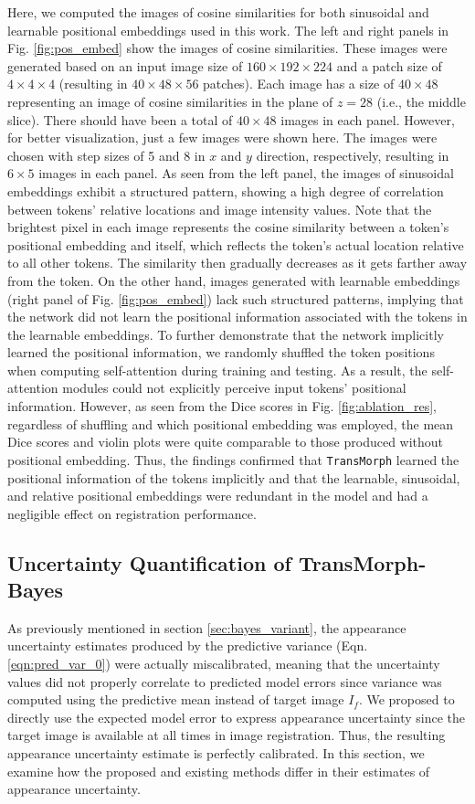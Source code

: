 \documentclass[times,twocolumn,final]{elsarticle}
\begin{document}
Here, we computed the images of cosine similarities for both sinusoidal and learnable positional embeddings used in this work. The left and right panels in Fig. \ref{fig:pos_embed} show the images of cosine similarities. These images were generated based on an input image size of $160\times192\times224$ and a patch size of $4\times4\times4$ (resulting in $40\times48\times56$ patches). Each image has a size of $40\times48$ representing an image of cosine similarities in the plane of $z=28$ (i.e., the middle slice). There should have been a total of $40\times48$ images in each panel. However, for better visualization, just a few images were shown here. The images were chosen with step sizes of 5 and 8 in $x$ and $y$ direction, respectively, resulting in $6\times5$ images in each panel. As seen from the left panel, the images of sinusoidal embeddings exhibit a structured pattern, showing a high degree of correlation between tokens' relative locations and image intensity values. Note that the brightest pixel in each image represents the cosine similarity between a token's positional embedding and itself, which reflects the token's actual location relative to all other tokens. The similarity then gradually decreases as it gets farther away from the token. On the other hand, images generated with learnable embeddings (right panel of Fig. \ref{fig:pos_embed}) lack such structured patterns, implying that the network did not learn the positional information associated with the tokens in the learnable embeddings. To further demonstrate that the network implicitly learned the positional information, we randomly shuffled the token positions when computing self-attention during training and testing. As a result, the self-attention modules could not explicitly perceive input tokens' positional information. However, as seen from the Dice scores in Fig. \ref{fig:ablation_res}, regardless of shuffling and which positional embedding was employed, the mean Dice scores and violin plots were quite comparable to those produced without positional embedding. Thus, the findings confirmed that \texttt{TransMorph} learned the positional information of the tokens implicitly and that the learnable, sinusoidal, and relative positional embeddings were redundant in the model and had a negligible effect on registration performance.

\subsection{Uncertainty Quantification of TransMorph-Bayes}
As previously mentioned in section \ref{sec:bayes_variant}, the appearance uncertainty estimates produced by the predictive variance (Eqn. \ref{eqn:pred_var_0}) were actually miscalibrated, meaning that the uncertainty values did not properly correlate to predicted model errors since variance was computed using the predictive mean instead of target image $I_f$. We proposed to directly use the expected model error to express appearance uncertainty since the target image is available at all times in image registration. Thus, the resulting appearance uncertainty estimate is perfectly calibrated. In this section, we examine how the proposed and existing methods differ in their estimates of appearance uncertainty.
\end{document}

